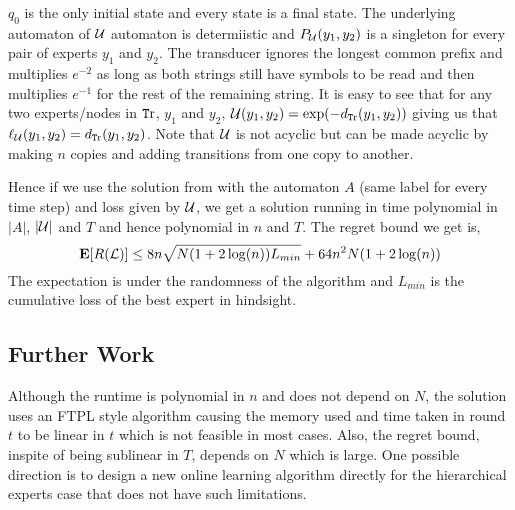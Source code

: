 $q_0$ is the only initial state and every state is a final state. The underlying automaton of ${\mathcal{U }}$  automaton is determiistic and $P_{\mathcal{U }}(y_1,y_2)$ is a singleton for every pair of experts $y_1$ and $y_2$. The transducer ignores the longest common prefix and multiplies $e^{-2}$ as long as both strings still have symbols to be read and then multiplies $e^{-1}$ for the rest of the remaining string. It is easy to see that for any two experts/nodes in $\text{\texttt Tr}$, $y_1$ and $y_2$, ${\mathcal{U }}(y_1,y_2) = \exp(-d_{\text{\texttt Tr}}(y_1,y_2))$ giving us that $\ell_{{\mathcal{U }}}(y_1,y_2) = d_{\text{\texttt Tr}}(y_1,y_2)$. Note that ${\mathcal{U }}$ is not acyclic but can be made acyclic by making $n$ copies and adding transitions from one copy to another.

Hence if we use the solution from \cite{cortes2015line} with the automaton $A$ (same label for every time step) and loss given by ${\mathcal{U }}$, we get a solution running in time polynomial in $|A|$, $|{\mathcal{U }}|$ and $T$ and hence polynomial in $n$ and $T$. The regret bound we get is,
$${\mathbf E}[R({\mathcal L})] \leq 8n\sqrt{N(1+2\log(n))L_{min}} + 64n^2N(1+2\log(n))$$
The expectation is under the randomness of the algorithm and $L_{min}$ is the cumulative loss of the best expert in hindsight. 

\subsection{Further Work}
Although the runtime is polynomial in $n$ and does not depend on $N$, the solution uses an FTPL style algorithm causing the memory used and time taken in round $t$ to be linear in $t$ which is not feasible in most cases. Also, the regret bound, inspite of being sublinear in $T$, depends on $N$ which is large. One possible direction is to design a new online learning algorithm directly for the hierarchical experts case that does not have such limitations.